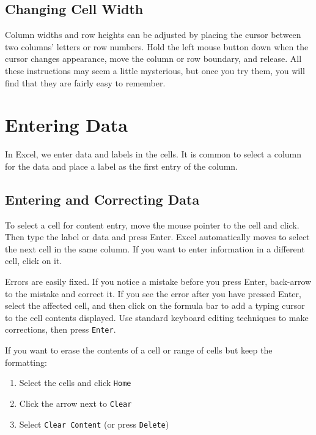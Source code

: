 \documentclass[
  12pt,
  letterpaper,
]{book}
\providecommand{\tightlist}{%
  \setlength{\itemsep}{0pt}\setlength{\parskip}{0pt}}
\begin{document}
\hypertarget{changing-cell-width}{%
\subsection{Changing Cell Width}\label{changing-cell-width}}

Column widths and row heights can be adjusted by placing the cursor between two columns' letters or row numbers. Hold the left mouse button down when the cursor changes appearance, move the column or row boundary, and release.
All these instructions may seem a little mysterious, but once you try them, you will find that they are fairly easy to remember.

\hypertarget{entering-data}{%
\section{Entering Data}\label{entering-data}}

In Excel, we enter data and labels in the cells. It is common to select a column for the data and place a label as the first entry of the column.

\hypertarget{entering-and-correcting-data}{%
\subsection{Entering and Correcting Data}\label{entering-and-correcting-data}}

To select a cell for content entry, move the mouse pointer to the cell and click. Then type the label or data and press Enter. Excel automatically moves to select the next cell in the same column. If you want to enter information in a different cell, click on it.

Errors are easily fixed. If you notice a mistake before you press Enter, back-arrow to the mistake and correct it. If you see the error after you have pressed Enter, select the affected cell, and then click on the formula bar to add a typing cursor to the cell contents displayed. Use standard keyboard editing techniques to make corrections, then press \texttt{Enter}.

If you want to erase the contents of a cell or range of cells but keep the formatting:

\begin{enumerate}
\def\labelenumi{\arabic{enumi}.}
\tightlist
\item
  Select the cells and click \texttt{Home}
\item
  Click the arrow next to \texttt{Clear}
\item
  Select \texttt{Clear\ Content} (or press \texttt{Delete})
\end{enumerate}
\end{document}
